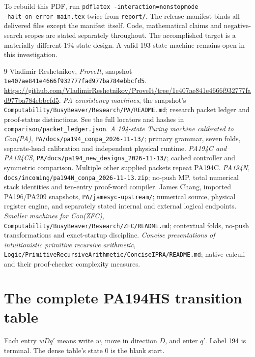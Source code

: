 \documentclass[11pt,letterpaper]{article}
\newcommand{\file}[1]{\texttt{\nolinkurl{#1}}}
\begin{document}
To rebuild this PDF, run \file{pdflatex -interaction=nonstopmode
-halt-on-error main.tex} twice from \file{report/}. The release manifest
binds all delivered files except the manifest itself. Code, mathematical
claims and negative-search scopes are stated separately throughout.
The accomplished target is a materially different 194-state design.
A valid 193-state machine remains open in this investigation.

\begin{thebibliography}{9}
 Vladimir Reshetnikov, \emph{ProveIt}, snapshot
\nolinkurl{1e407ae841e4666f932777fad977ba784ebbcfd5}.
\url{https://github.com/VladimirReshetnikov/ProveIt/tree/1e407ae841e4666f932777fad977ba784ebbcfd5}.
 \emph{PA consistency machines}, the snapshot's
\file{Computability/BusyBeaver/Research/PA/README.md}; research packet
ledger and proof-status distinctions. See the full locators and hashes in
\file{comparison/packet_ledger.json}.
 \emph{A 194-state Turing machine calibrated to Con(PA)},
\file{PA/docs/pa194_conpa_2026-11-13/}; primary grammar, seven folds,
separate-head calibration and independent physical runtime.
 \emph{PA194C and PA194CS},
\file{PA/docs/pa194_new_designs_2026-11-13/}; cached controller and
symmetric comparison. Multiple other supplied packets repeat PA194C.
 \emph{PA194N},
\file{docs/incoming/pa194N_conpa_2026-11-13.zip}; no-push MP, total
numerical stack identities and ten-entry proof-word compiler.
 James Chang, imported PA196/PA209 snapshots,
\file{PA/jamesyc-upstream/}; numerical source, physical register engine,
and separately stated internal and external logical endpoints.
 \emph{Smaller machines for Con(ZFC)},
\file{Computability/BusyBeaver/Research/ZFC/README.md}; contextual
folds, no-push transformations and exact-startup discipline.
 \emph{Concise presentations of intuitionistic primitive
recursive arithmetic}, \file{Logic/PrimitiveRecursiveArithmetic/ConciseIPRA/README.md};
native calculi and their proof-checker complexity measures.
\end{thebibliography}

\appendix
\clearpage
\section{The complete PA194HS transition table}\label{app:table}
Each entry $wDq'$ means write $w$, move in direction $D$, and enter $q'$.
Label 194 is terminal. The dense table's state 0 is the blank start.

\end{document}
